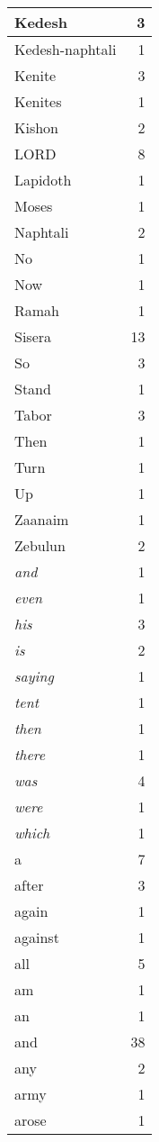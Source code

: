 \begin{center}
\begin{longtable}{l|r}
Kedesh & 3\\ \hline 
Kedesh-naphtali & 1\\ \hline 
Kenite & 3\\ \hline 
Kenites & 1\\ \hline 
Kishon & 2\\ \hline 
LORD & 8\\ \hline 
Lapidoth & 1\\ \hline 
Moses & 1\\ \hline 
Naphtali & 2\\ \hline 
No & 1\\ \hline 
Now & 1\\ \hline 
Ramah & 1\\ \hline 
Sisera & 13\\ \hline 
So & 3\\ \hline 
Stand & 1\\ \hline 
Tabor & 3\\ \hline 
Then & 1\\ \hline 
Turn & 1\\ \hline 
Up & 1\\ \hline 
Zaanaim & 1\\ \hline 
Zebulun & 2\\ \hline 
\emph{and} & 1\\ \hline 
\emph{even} & 1\\ \hline 
\emph{his} & 3\\ \hline 
\emph{is} & 2\\ \hline 
\emph{saying} & 1\\ \hline 
\emph{tent} & 1\\ \hline 
\emph{then} & 1\\ \hline 
\emph{there} & 1\\ \hline 
\emph{was} & 4\\ \hline 
\emph{were} & 1\\ \hline 
\emph{which} & 1\\ \hline 
a & 7\\ \hline 
after & 3\\ \hline 
again & 1\\ \hline 
against & 1\\ \hline 
all & 5\\ \hline 
am & 1\\ \hline 
an & 1\\ \hline 
and & 38\\ \hline 
any & 2\\ \hline 
army & 1\\ \hline 
arose & 1\\ \hline 

\end{longtable}
\end{center}
